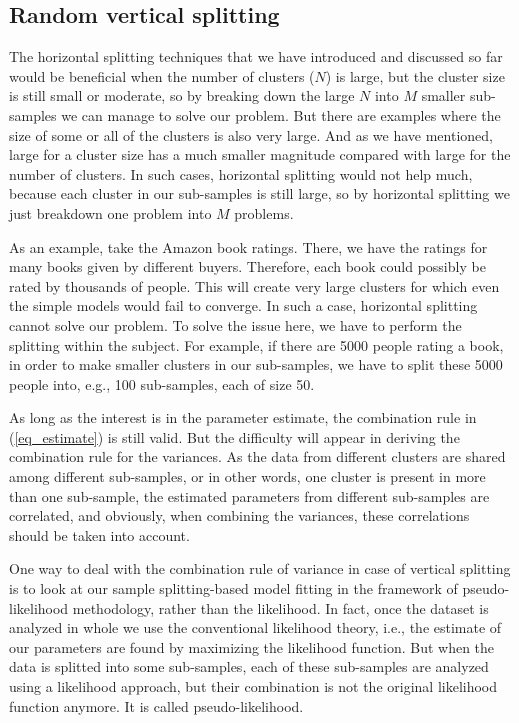 \documentclass[11pt,a5paper,twoside]{book}
\begin{document}
\subsection{Random vertical splitting}
\label{sec_intro_random_vertical}
The horizontal splitting techniques that we have introduced and discussed so far would be beneficial when the number of clusters ($N$) is large, but the cluster size is still small or moderate, so by breaking down the large $N$ into $M$ smaller sub-samples we can manage to solve our problem. But there are examples where the size of some or all of the clusters is also very large. And as we have mentioned, large for a cluster size has a much smaller magnitude compared with large for the number of clusters. In such cases, horizontal splitting would not help much, because each cluster in our sub-samples is still large, so by horizontal splitting we just breakdown one problem into $M$ problems. 

As an example, take the Amazon book ratings. There, we have the ratings for many books given by different buyers. Therefore, each book could possibly be rated by thousands of people. This will create very large clusters for which even the simple models would fail to converge. In such a case, horizontal splitting cannot solve our problem. To solve the issue here, we have to perform the splitting within the subject. For example, if there are 5000 people rating a book, in order to make smaller clusters in our sub-samples, we have to split these 5000 people into, e.g., 100 sub-samples, each of size 50. 

As long as the interest is in the parameter estimate, the combination rule in (\ref{eq_estimate}) is still valid. But the difficulty will appear in deriving the combination rule for the variances. As the data from different clusters are shared among different sub-samples, or in other words, one cluster is present in more than one sub-sample, the estimated parameters from different sub-samples are correlated, and obviously, when combining the variances, these correlations should be taken into account. 

One way to deal with the combination rule of variance in case of vertical splitting is to look at our sample splitting-based model fitting in the framework of pseudo-likelihood methodology, rather than the likelihood. In fact, once the dataset is analyzed in whole we use the conventional likelihood theory, i.e., the estimate of our parameters are found by maximizing the likelihood function. But when the data is splitted into some sub-samples, each of these sub-samples are analyzed using a likelihood approach, but their combination is not the original likelihood function anymore. It is called pseudo-likelihood. 
\end{document}
